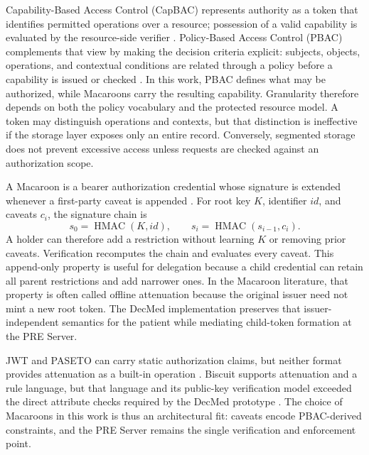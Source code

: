 \documentclass[conference,a4paper,english]{IEEEtran}
\begin{document}
Capability-Based Access Control (CapBAC) represents authority as a token that identifies permitted operations over a resource; possession of a valid capability is evaluated by the resource-side verifier \cite{li2022capability}. Policy-Based Access Control (PBAC) complements that view by making the decision criteria explicit: subjects, objects, operations, and contextual conditions are related through a policy before a capability is issued or checked \cite{ferraiolo2015policy}. In this work, PBAC defines what may be authorized, while Macaroons carry the resulting capability. Granularity therefore depends on both the policy vocabulary and the protected resource model. A token may distinguish operations and contexts, but that distinction is ineffective if the storage layer exposes only an entire record. Conversely, segmented storage does not prevent excessive access unless requests are checked against an authorization scope.

A Macaroon is a bearer authorization credential whose signature is extended whenever a first-party caveat is appended \cite{birgisson2014macaroons}. For root key $K$, identifier $id$, and caveats $c_i$, the signature chain is
\begin{equation}
	s_0=\operatorname{HMAC}(K,id),\qquad
	s_i=\operatorname{HMAC}(s_{i-1},c_i).
	\label{eq:macaroon-chain}
\end{equation}
A holder can therefore add a restriction without learning $K$ or removing prior caveats. Verification recomputes the chain and evaluates every caveat. This append-only property is useful for delegation because a child credential can retain all parent restrictions and add narrower ones. In the Macaroon literature, that property is often called offline attenuation because the original issuer need not mint a new root token. The DecMed implementation preserves that issuer-independent semantics for the patient while mediating child-token formation at the PRE Server.

JWT and PASETO can carry static authorization claims, but neither format provides attenuation as a built-in operation \cite{jones2015jwt,arciszewski2022paseto}. Biscuit supports attenuation and a rule language, but that language and its public-key verification model exceeded the direct attribute checks required by the DecMed prototype \cite{biscuitsec}. The choice of Macaroons in this work is thus an architectural fit: caveats encode PBAC-derived constraints, and the PRE Server remains the single verification and enforcement point.
\end{document}
